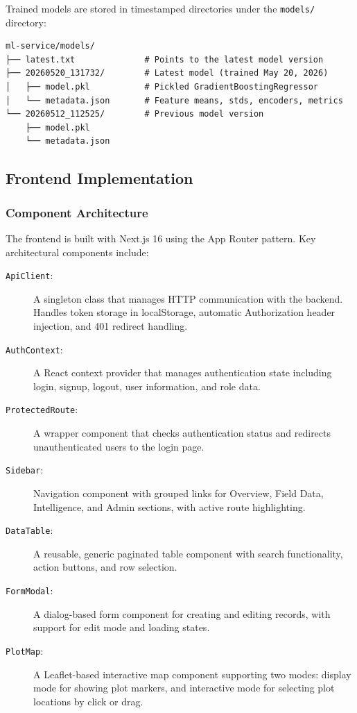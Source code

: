Trained models are stored in timestamped directories under the \texttt{models/} directory:

\begin{verbatim}
ml-service/models/
├── latest.txt              # Points to the latest model version
├── 20260520_131732/        # Latest model (trained May 20, 2026)
│   ├── model.pkl           # Pickled GradientBoostingRegressor
│   └── metadata.json       # Feature means, stds, encoders, metrics
└── 20260512_112525/        # Previous model version
    ├── model.pkl
    └── metadata.json
\end{verbatim}

\subsection{Frontend Implementation}

\subsubsection{Component Architecture}

The frontend is built with Next.js 16 using the App Router pattern. Key architectural components include:

\begin{description}
  \item[\texttt{ApiClient}:] A singleton class that manages HTTP communication with the backend. Handles token storage in localStorage, automatic Authorization header injection, and 401 redirect handling.
  
  \item[\texttt{AuthContext}:] A React context provider that manages authentication state including login, signup, logout, user information, and role data.
  
  \item[\texttt{ProtectedRoute}:] A wrapper component that checks authentication status and redirects unauthenticated users to the login page.
  
  \item[\texttt{Sidebar}:] Navigation component with grouped links for Overview, Field Data, Intelligence, and Admin sections, with active route highlighting.
  
  \item[\texttt{DataTable}:] A reusable, generic paginated table component with search functionality, action buttons, and row selection.
  
  \item[\texttt{FormModal}:] A dialog-based form component for creating and editing records, with support for edit mode and loading states.
  
  \item[\texttt{PlotMap}:] A Leaflet-based interactive map component supporting two modes: display mode for showing plot markers, and interactive mode for selecting plot locations by click or drag.
\end{description}

